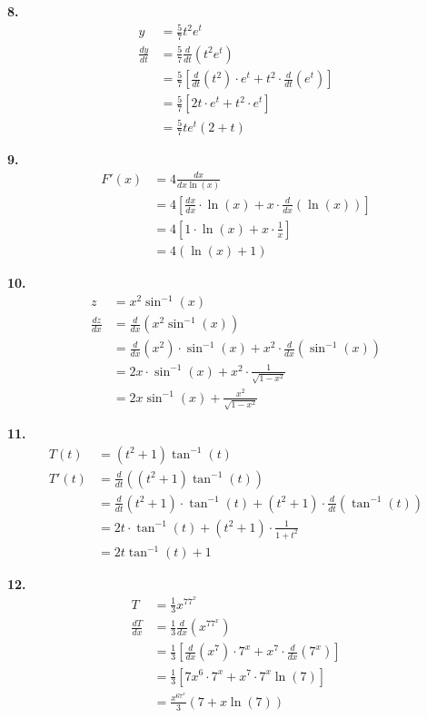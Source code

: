 \documentclass[10pt,oneside,]{book}
\theoremstyle{plain}
\theoremstyle{definition}
\numberwithin{equation}{section}
\newcommand{\fe}[2]{#1\mathopen{}\left(#2\right)\mathclose{}}
\newcommand{\fd}[1]{#1'}
\newcommand{\lz}[2]{\frac{d#1}{d#2}}
\newcommand{\lzoo}[2]{{\frac{d}{d#1}}{\left(#2\right)}}
\begin{document}
\par\smallskip
\noindent\textbf{8.}\quad{}\begin{align*}
y&=\frac{5}{7}t^2e^t\\
\lz{y}{t}&=\frac{5}{7}\lzoo{t}{t^2e^t}\\
&=\frac{5}{7}\left[\lzoo{t}{t^2}\cdot e^t+t^2\cdot\lzoo{t}{e^t}\right]\\
&=\frac{5}{7}\left[2t\cdot e^t+t^2\cdot e^t\right]\\
&=\frac{5}{7}te^t(2+t)
\end{align*}%
\par\smallskip
\noindent\textbf{9.}\quad{}\begin{align*}
\fe{\fd{F}}{x}&=4\lz{x}{x\fe{\ln}{x}}\\
&=4\left[\lz{x}{x}\cdot\fe{\ln}{x}+x\cdot\lzoo{x}{\fe{\ln}{x}}\right]\\
&=4\left[1\cdot\fe{\ln}{x}+x\cdot\frac{1}{x}\right]\\
&=4(\fe{\ln}{x}+1)
\end{align*}%
\par\smallskip
\noindent\textbf{10.}\quad{}\begin{align*}
z&=x^2\fe{\sin^{-1}}{x}\\
\lz{z}{x}&=\lzoo{x}{x^2\fe{\sin^{-1}}{x}}\\
&=\lzoo{x}{x^2}\cdot\fe{\sin^{-1}}{x}+x^2\cdot\lzoo{x}{\fe{\sin^{-1}}{x}}\\
&=2x\cdot\fe{\sin^{-1}}{x}+x^2\cdot\frac{1}{\sqrt{1-x^2}}\\
&=2x\fe{\sin^{-1}}{x}+\frac{x^2}{\sqrt{1-x^2}}
\end{align*}%
\par\smallskip
\noindent\textbf{11.}\quad{}\begin{align*}
\fe{T}{t}&=(t^2+1)\fe{\tan^{-1}}{t}\\
\fe{\fd{T}}{t}&=\lzoo{t}{(t^2+1)\fe{\tan^{-1}}{t}}\\
&=\lzoo{t}{t^2+1}\cdot\fe{\tan^{-1}}{t}+(t^2+1)\cdot\lzoo{t}{\fe{\tan^{-1}}{t}}\\
&=2t\cdot\fe{\tan^{-1}}{t}+(t^2+1)\cdot\frac{1}{1+t^2}\\
&=2t\fe{\tan^{-1}}{t}+1
\end{align*}%
\par\smallskip
\noindent\textbf{12.}\quad{}\begin{align*}
T&=\frac{1}{3}x^77^x\\
\lz{T}{x}&=\frac{1}{3}\lzoo{x}{x^77^x}\\
&=\frac{1}{3}\left[\lzoo{x}{x^7}\cdot7^x+x^7\cdot\lzoo{x}{7^x}\right]\\
&=\frac{1}{3}\left[7x^6\cdot7^x+x^7\cdot7^x\fe{\ln}{7}\right]\\
&=\frac{x^67^x}{3}(7+x\fe{\ln}{7})
\end{align*}%
\end{document}
